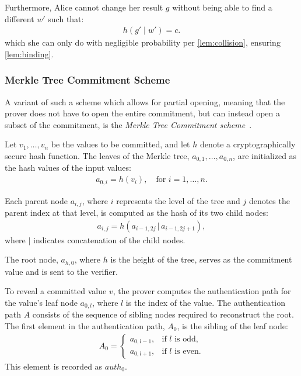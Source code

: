 \documentclass[11pt]{report}
\theoremstyle{definition}
\theoremstyle{plain}
\begin{document}
Furthermore, Alice cannot change her result $g$ without being able to find a different $w'$ such that:
\begin{align*}
  h(g' \mid w') = c.
\end{align*}
which she can only do with negligible probability per \autoref{lem:collision}, ensuring \autoref{lem:binding}.

\subsubsection{Merkle Tree Commitment Scheme}
\label{sub:merkle_tree_prelim}
A variant of such a scheme which allows for partial opening, meaning that the prover does not have to open the entire commitment, but can instead open a subset of the commitment, is the \textit{Merkle Tree Commitment scheme}~\cite{becker2008merkle}.

Let $v_1, \dots, v_n$ be the values to be committed, and let $h$ denote a cryptographically secure hash function. The leaves of the Merkle tree, $a_{0,1}, \dots, a_{0,n}$, are initialized as the hash values of the input values:
\begin{align*}
  a_{0,i} = h(v_i), \quad \text{for } i = 1, \dots, n.
\end{align*}

Each parent node $a_{i,j}$, where $i$ represents the level of the tree and $j$ denotes the parent index at that level, is computed as the hash of its two child nodes:
\begin{align*}
  a_{i,j} = h(a_{i-1,2j} \, | \, a_{i-1,2j+1}),
\end{align*}
where $|$ indicates concatenation of the child nodes.

The root node, $a_{h,0}$, where $h$ is the height of the tree, serves as the commitment value and is sent to the verifier.

To reveal a committed value $v$, the prover computes the authentication path for the value's leaf node $a_{0,l}$, where $l$ is the index of the value. The authentication path $A$ consists of the sequence of sibling nodes required to reconstruct the root. The first element in the authentication path, $A_0$, is the sibling of the leaf node:
\begin{align*}
  A_0 =
  \begin{cases}
    a_{0,l-1}, & \text{if } l \text{ is odd,}  \\
    a_{0,l+1}, & \text{if } l \text{ is even.}
  \end{cases}
\end{align*}
This element is recorded as $auth_0$.
\end{document}
